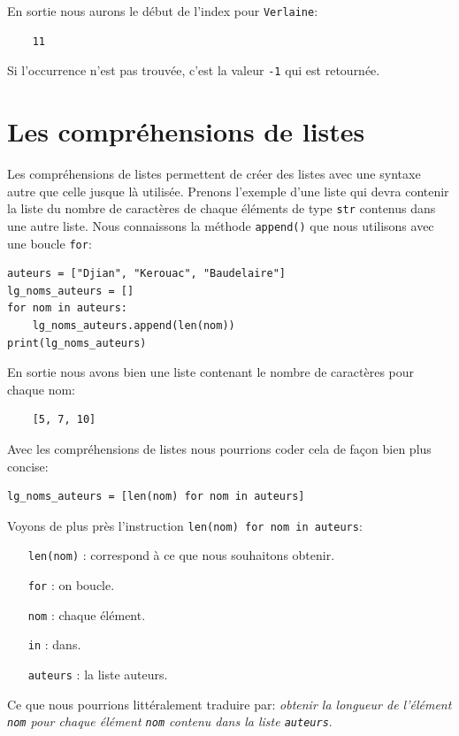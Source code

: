 \documentclass[a4paper,12pt]{book}
\begin{document}
En sortie nous aurons le début de l'index pour \og \texttt{Verlaine}\fg{}:
\begin{verbatim}
    11
\end{verbatim}
\medskip

Si l'occurrence n'est pas trouvée, c'est la valeur \texttt{-1} qui est retournée.
\medskip

\section{Les compréhensions de listes}
Les compréhensions de listes permettent de créer des listes avec une syntaxe autre que celle jusque là utilisée. Prenons l'exemple d'une liste qui devra contenir la liste du nombre de caractères de chaque éléments de type \texttt{str} contenus dans une autre liste. Nous connaissons la méthode \texttt{append()} que nous utilisons avec une boucle \texttt{for}:
\begin{lstlisting}
auteurs = ["Djian", "Kerouac", "Baudelaire"]
lg_noms_auteurs = []
for nom in auteurs:
    lg_noms_auteurs.append(len(nom))
print(lg_noms_auteurs)
\end{lstlisting}
\medskip
 
En sortie nous avons bien une liste contenant le nombre de caractères pour chaque nom:
\begin{verbatim}
    [5, 7, 10]
\end{verbatim}
\medskip

Avec les compréhensions de listes nous pourrions coder cela de façon bien plus concise:
\begin{lstlisting}
lg_noms_auteurs = [len(nom) for nom in auteurs]
\end{lstlisting}
\medskip

Voyons de plus près l'instruction \texttt{len(nom) for nom in auteurs}:
\begin{itemize}
	\item[\texttt{len(nom)}]: correspond à ce que nous souhaitons obtenir.
	\item[\texttt{for}]: on boucle.
	\item[\texttt{nom}]: chaque élément.
	\item[\texttt{in}]: dans.
	\item[\texttt{auteurs}]: la liste auteurs.
\end{itemize}
\medskip

Ce que nous pourrions littéralement traduire par: \textit{obtenir la longueur de l'élément \texttt{nom} pour chaque élément \texttt{nom} contenu dans la liste \texttt{auteurs}}.
\medskip
\end{document}
